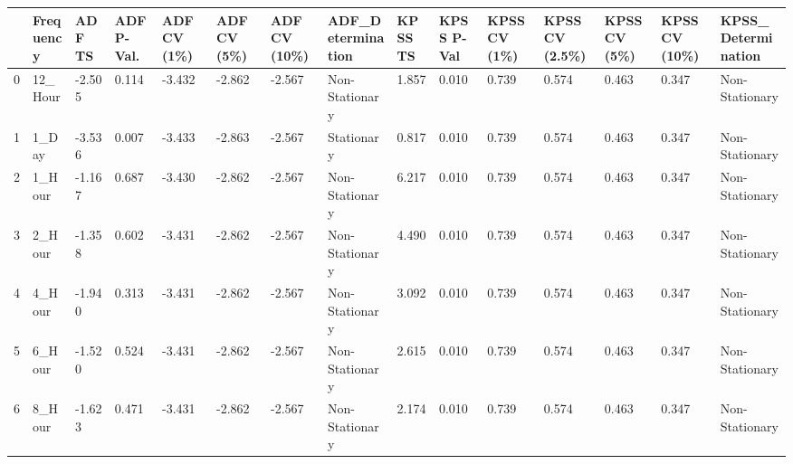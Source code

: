 \begin{tabular}{lllllllllllllll}
\toprule
 & Frequency & ADF TS & ADF P-Val. & ADF CV (1\%) & ADF CV (5\%) & ADF CV (10\%) & ADF_Determination & KPSS TS & KPSS P-Val & KPSS CV (1\%) & KPSS CV (2.5\%) & KPSS CV (5\%) & KPSS CV (10\%) & KPSS_Determination \\
\midrule
0 & 12_Hour & -2.505 & 0.114 & -3.432 & -2.862 & -2.567 & Non-Stationary & 1.857 & 0.010 & 0.739 & 0.574 & 0.463 & 0.347 & Non-Stationary \\
1 & 1_Day & -3.536 & 0.007 & -3.433 & -2.863 & -2.567 & Stationary & 0.817 & 0.010 & 0.739 & 0.574 & 0.463 & 0.347 & Non-Stationary \\
2 & 1_Hour & -1.167 & 0.687 & -3.430 & -2.862 & -2.567 & Non-Stationary & 6.217 & 0.010 & 0.739 & 0.574 & 0.463 & 0.347 & Non-Stationary \\
3 & 2_Hour & -1.358 & 0.602 & -3.431 & -2.862 & -2.567 & Non-Stationary & 4.490 & 0.010 & 0.739 & 0.574 & 0.463 & 0.347 & Non-Stationary \\
4 & 4_Hour & -1.940 & 0.313 & -3.431 & -2.862 & -2.567 & Non-Stationary & 3.092 & 0.010 & 0.739 & 0.574 & 0.463 & 0.347 & Non-Stationary \\
5 & 6_Hour & -1.520 & 0.524 & -3.431 & -2.862 & -2.567 & Non-Stationary & 2.615 & 0.010 & 0.739 & 0.574 & 0.463 & 0.347 & Non-Stationary \\
6 & 8_Hour & -1.623 & 0.471 & -3.431 & -2.862 & -2.567 & Non-Stationary & 2.174 & 0.010 & 0.739 & 0.574 & 0.463 & 0.347 & Non-Stationary \\
\bottomrule
\end{tabular}
